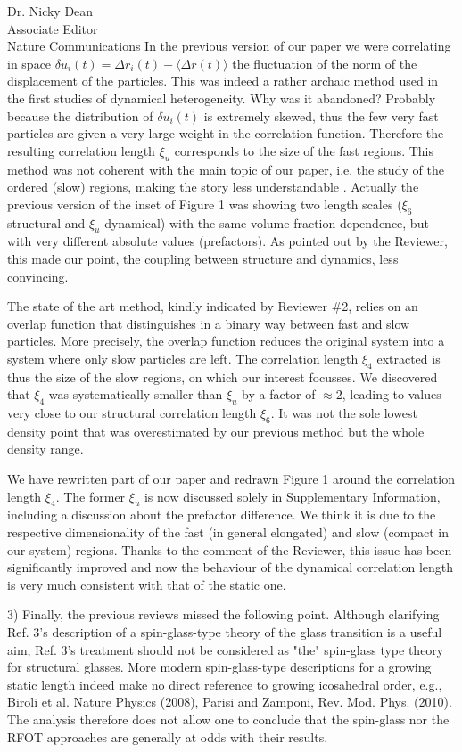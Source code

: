 \documentclass[a4paper, rebuttal, parskip=true, firsthead=false, fromemail=true, foldmarks=false]{scrlttr2}
\begin{document}
\begin{letter}{Dr. Nicky Dean\\
Associate Editor\\
Nature Communications}
In the previous version of our paper we were correlating in space $\delta u_i(t) = \Delta r_i(t)-\langle\Delta r(t)\rangle$ the fluctuation of the norm of the displacement of the particles. This was indeed a rather archaic method used in the first studies of dynamical heterogeneity. Why was it abandoned? Probably because the distribution of $\delta u_i(t)$ is extremely skewed, thus the few very fast particles are given a very large weight in the correlation function. Therefore the resulting correlation length $\xi_u$ corresponds to the size of the fast regions. This method was not coherent with the main topic of our paper, i.e. the study of the ordered (slow) regions, making the story less understandable%
. Actually the previous version of the inset of Figure 1 was showing two length scales ($\xi_6$ structural and $\xi_u$ dynamical) with the same volume fraction dependence, but with very different absolute values (prefactors). As pointed out by the Reviewer, this made our point, the coupling between structure and dynamics, less convincing.

The state of the art method, kindly indicated by Reviewer \#2, relies on an overlap function that distinguishes in a binary way between fast and slow particles. More precisely, the overlap function reduces the original system into a system where only slow particles are left. The correlation length $\xi_4$ extracted is thus the size of the slow regions, on which our interest focusses. We discovered that $\xi_4$ was systematically smaller than $\xi_u$ by a factor of $\approx 2$, leading to values very close to our structural correlation length $\xi_6$. It was not the sole lowest density point that was overestimated by our previous method but the whole density range.

We have rewritten part of our paper and redrawn Figure 1 around the correlation length $\xi_4$. The former $\xi_u$ is now discussed solely in Supplementary Information, including a discussion about the prefactor difference. We think it is due to the respective dimensionality of the fast (in general elongated) and slow (compact in our system) regions.
Thanks to the comment of the Reviewer, this issue has been significantly improved and now the behaviour of the dynamical correlation length is very much consistent with that 
of the static one. 

\begin{quotationi}
3) Finally, the previous reviews missed the following point. Although clarifying Ref. 3's description of a spin-glass-type theory of the glass transition is a useful aim, Ref. 3's treatment should not be considered as "the" spin-glass type theory for structural glasses. More modern spin-glass-type descriptions for a growing static length indeed make no direct reference to growing icosahedral order, e.g., Biroli et al. Nature Physics (2008), Parisi and Zamponi, Rev. Mod. Phys. (2010). The analysis therefore does not allow one to conclude that the spin-glass nor the RFOT approaches are generally at odds with their results.
\end{quotationi}


\end{letter}
\end{document}
